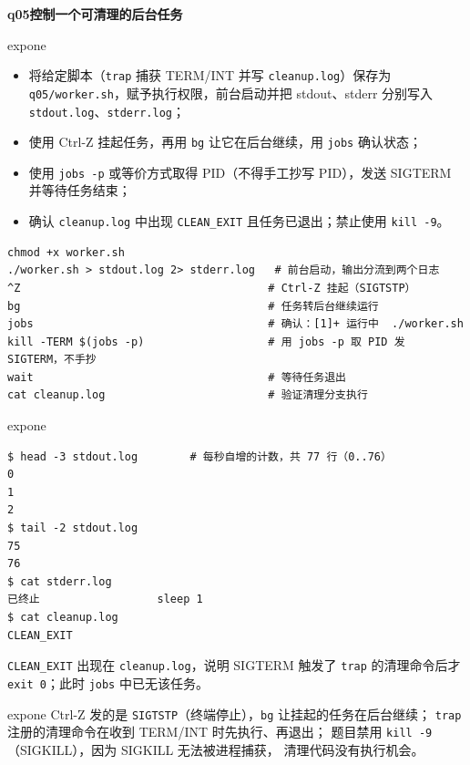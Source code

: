 \documentclass[11pt,a4paper,fontset=none]{ctexart}
\newcommand{\hwbanner}[3]{%
  \par\vspace{1.1em}
  \begin{tcolorbox}[enhanced, colback=#1!8, colframe=#1!75!black,
    boxrule=0.8pt, arc=2pt, left=7pt, right=7pt, top=4pt, bottom=4pt,
    before skip=1.1em]
    {\bfseries\color{#1!75!black}#2\qquad #3}
  \end{tcolorbox}
  \par\vspace{0.1em}\noindent\ignorespaces
}
\newcommand{\sublabel}[2]{%
  \par\vspace{0.8em}\noindent{\bfseries\color{#1!75!black}#2}\par\nobreak\vspace{0.25em}\noindent\ignorespaces
}
\begin{document}
\hwbanner{expone}{q05}{控制一个可清理的后台任务}
\begin{reqbox}{expone}
\begin{itemize}[leftmargin=1.4em, itemsep=1pt]
  \item 将给定脚本（\texttt{trap} 捕获 TERM/INT 并写 \texttt{cleanup.log}）保存为
        \texttt{q05/worker.sh}，赋予执行权限，前台启动并把 stdout、stderr
        分别写入 \texttt{stdout.log}、\texttt{stderr.log}；
  \item 使用 Ctrl-Z 挂起任务，再用 \texttt{bg} 让它在后台继续，用 \texttt{jobs} 确认状态；
  \item 使用 \texttt{jobs -p} 或等价方式取得 PID（不得手工抄写 PID），发送 SIGTERM 并等待任务结束；
  \item 确认 \texttt{cleanup.log} 中出现 \texttt{CLEAN\_EXIT} 且任务已退出；禁止使用 \texttt{kill -9}。
\end{itemize}
\end{reqbox}
\sublabel{expone}{\faTerminal\ 操作过程}
\begin{lstlisting}[style=shell]
chmod +x worker.sh
./worker.sh > stdout.log 2> stderr.log   # 前台启动，输出分流到两个日志
^Z                                      # Ctrl-Z 挂起（SIGTSTP）
bg                                      # 任务转后台继续运行
jobs                                    # 确认：[1]+ 运行中  ./worker.sh
kill -TERM $(jobs -p)                   # 用 jobs -p 取 PID 发 SIGTERM，不手抄
wait                                    # 等待任务退出
cat cleanup.log                         # 验证清理分支执行
\end{lstlisting}
\begin{resbox}{expone}
\begin{lstlisting}[style=output]
$ head -3 stdout.log        # 每秒自增的计数，共 77 行（0..76）
0
1
2
$ tail -2 stdout.log
75
76
$ cat stderr.log
已终止                  sleep 1
$ cat cleanup.log
CLEAN_EXIT
\end{lstlisting}
\texttt{CLEAN\_EXIT} 出现在 \texttt{cleanup.log}，说明 SIGTERM 触发了
\texttt{trap} 的清理命令后才 \texttt{exit 0}；此时 \texttt{jobs} 中已无该任务。
\end{resbox}
\begin{trapbox}{expone}
  Ctrl-Z 发的是 \texttt{SIGTSTP}（终端停止），\texttt{bg} 让挂起的任务在后台继续；
  \texttt{trap} 注册的清理命令在收到 TERM/INT 时先执行、再退出；
  题目禁用 \texttt{kill -9}（SIGKILL），因为 SIGKILL 无法被进程捕获，
  清理代码没有执行机会。
\end{trapbox}
\end{document}
